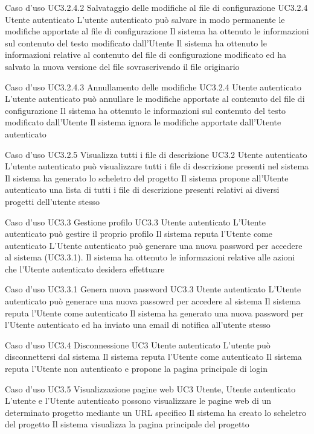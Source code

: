\UCtitle
{Caso d'uso UC3.2.4.2}
{Salvataggio delle modifiche al file di configurazione}
\UC
{UC3.2.4}
{Utente autenticato}
{L'utente autenticato può salvare in modo permanente le modifiche apportate al file di configurazione}
{Il sistema ha ottenuto le informazioni sul contenuto del testo modificato dall'Utente}
\post
{Il sistema ha ottenuto le informazioni relative al contenuto del file di configurazione modificato ed ha salvato la nuova versione del file sovrascrivendo il file originario}

\UCtitle
{Caso d'uso UC3.2.4.3}
{Annullamento delle modifiche}
\UC
{UC3.2.4}
{Utente autenticato}
{L'utente autenticato può annullare le modifiche apportate al contenuto del file di configurazione}
{Il sistema ha ottenuto le informazioni sul contenuto del testo modificato dall'Utente}
\post
{Il sistema ignora le modifiche apportate dall'Utente autenticato}

\UCtitle
{Caso d'uso UC3.2.5}
{Visualizza tutti i file di descrizione}
\UC
{UC3.2}
{Utente autenticato}
{L'utente autenticato può visualizzare tutti i file di descrizione presenti nel sistema}
{Il sistema ha generato lo scheletro del progetto}
\post
{Il sistema propone all'Utente autenticato una lista di tutti i file di descrizione presenti relativi ai diversi progetti dell'utente stesso}


\UCtitle
{Caso d'uso UC3.3}
{Gestione profilo}
\UC
{UC3.3}
{Utente autenticato}
{L'Utente autenticato può gestire il proprio profilo}
{Il sistema reputa l'Utente come autenticato}
\scenario
{L'Utente autenticato può generare una nuova password per accedere al sistema (UC3.3.1).}
\post
{Il sistema ha ottenuto le informazioni relative alle azioni che l'Utente autenticato desidera effettuare}

\UCtitle
{Caso d'uso UC3.3.1}
{Genera nuova password}
\UC
{UC3.3}
{Utente autenticato}
{L'Utente autenticato può generare una nuova passowrd per accedere al sistema}
{Il sistema reputa l'Utente come autenticato}
\post
{Il sistema ha generato una nuova password per l'Utente autenticato ed ha inviato una email di notifica all'utente stesso}

\UCtitle
{Caso d'uso UC3.4}
{Disconnessione}
\UC
{UC3}
{Utente autenticato}
{L'utente può disconnettersi dal sistema}
{Il sistema reputa l'Utente come autenticato}
\post
{Il sistema reputa l'Utente non autenticato e propone la pagina principale di login}


\UCtitle
{Caso d'uso UC3.5}
{Visualizzazione pagine web}
\UC
{UC3}
{Utente, Utente autenticato}
{L'utente e l'Utente autenticato possono visualizzare le pagine web di un determinato progetto mediante un URL specifico}
{Il sistema ha creato lo scheletro del progetto}
\post
{Il sistema visualizza la pagina principale del progetto}


